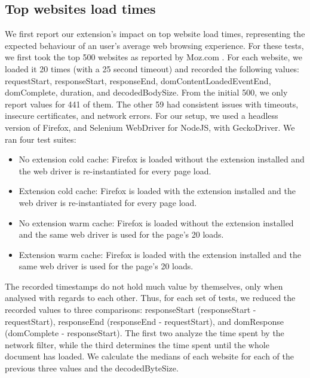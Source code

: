 \subsection{Top websites load times}
We first report our extension's impact on top website load times, representing the expected behaviour of an user's average web browsing experience. For these tests, we first took the top 500 websites as reported by Moz.com \cite{top500}. For each website, we loaded it 20 times (with a 25 second timeout) and recorded the following values: requestStart, responseStart, responseEnd, domContentLoadedEventEnd, domComplete, duration, and decodedBodySize. From the initial 500, we only report values for 441 of them. The other 59 had consistent issues with timeouts, insecure certificates, and network errors. For our setup, we used a headless version of Firefox, and Selenium WebDriver for NodeJS, with GeckoDriver. We ran four test suites:
\begin{itemize}
	\item No extension cold cache: Firefox is loaded without the extension installed and the web driver is re-instantiated for every page load.
	\item Extension cold cache: Firefox is loaded with the extension installed and the web driver is re-instantiated for every page load.
	\item No extension warm cache: Firefox is loaded without the extension installed and the same web driver is used for the page's 20 loads.
	\item Extension warm cache: Firefox is loaded with the extension installed and the same web driver is used for the page's 20 loads.
\end{itemize}

The recorded timestamps do not hold much value by themselves, only when analysed with regards to each other. Thus, for each set of tests, we reduced the recorded values to three comparisons: responseStart (responseStart - requestStart), responseEnd (responseEnd - requestStart), and domResponse (domComplete - responseStart). The first two analyze the time spent by the network filter, while the third determines the time spent until the whole document has loaded. We calculate the medians of each website for each of the previous three values and the decodedByteSize.

